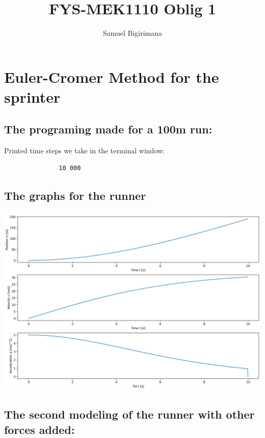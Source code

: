 \documentclass{article}
\title{FYS-MEK1110 Oblig 1}
\author{Samuel Bigirimana}
\begin{document}
    \maketitle
    \section*{Euler-Cromer Method for the sprinter}

        \subsection*{The programing made for a 100m run: }
            
            Printed time steps we take in the terminal window:
            \begin{verbatim}
               10 000
            \end{verbatim}

            \clearpage
        
        \subsection*{The graphs for the runner}
            \includegraphics[width=1.2\textwidth,left]{../../graphs/sprinter.png}

            \clearpage

        \subsection*{The second modeling of the runner with other forces added:}
            
\end{document}
